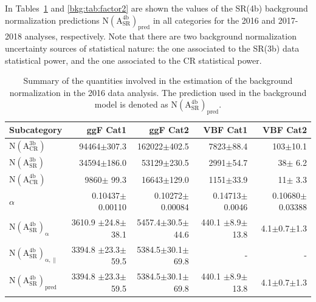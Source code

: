 In Tables~\ref{bkg:tab:factor1} and \ref{bkg:tab:factor2} are shown the values of the SR(4b) background normalization predictions $\mathrm{N(A_{SR}^{4b})_{pred}}$ in all categories for the 2016 and 2017-2018 analyses, respectively. Note that there are two background normalization uncertainty sources of statistical nature: the one associated to the SR(3b) data statistical power, and the one associated to the CR statistical power.

\begin{table}[htb!]
\caption[Summary of the quantities involved in the estimation of the background normalization in the 2016 data analysis.]{\label{bkg:tab:factor1} Summary of the quantities involved in the estimation of the background normalization in the 2016 data analysis. The prediction used in the background model is denoted as $\mathrm{N(A_{SR}^{4b})_{pred}}$.}
\centering
\small
\begin{tabularx}{\textwidth}{l r r r r}
    \hline
    Subcategory                    & ggF Cat1                      & ggF Cat2                    & VBF Cat1                     & VBF Cat2                  \\
    \hline
    $\mathrm{N(A_{CR}^{3b})}$         & 94464$\pm$307.3          & 162022$\pm$402.5        & 7823$\pm$88.4            &    103$\pm$10.1       \\
    $\mathrm{N(A_{SR}^{3b})}$         & 34594$\pm$186.0          &  53129$\pm$230.5        & 2991$\pm$54.7            &     38$\pm$ 6.2       \\
    $\mathrm{N(A_{CR}^{4b})}$         &  9860$\pm$ 99.3          &  16643$\pm$129.0        & 1151$\pm$33.9            &     11$\pm$ 3.3       \\
    $\alpha$                                    & 0.10437$\pm$0.00110      &0.10272$\pm$0.00084      &0.14713$\pm$0.0046        &0.10680$\pm$0.03388    \\
    $\mathrm{N(A_{SR}^{4b})_{\alpha}}$          & 3610.9 $\pm$24.8$\pm$38.1& 5457.4$\pm$30.5$\pm$44.6     & 440.1 $\pm$8.9$\pm$13.8  &    4.1$\pm$0.7$\pm$1.3\\
    $\mathrm{N(A_{SR}^{4b})_{\alpha,\parallel}}$& 3394.8 $\pm$23.3$\pm$59.5& 5384.5$\pm$30.1$\pm$69.8     &          -               &         -             \\
    $\mathrm{N(A_{SR}^{4b})_{pred}}$            & 3394.8 $\pm$23.3$\pm$59.5& 5384.5$\pm$30.1$\pm$69.8     & 440.1 $\pm$8.9$\pm$13.8  &    4.1$\pm$0.7$\pm$1.3\\  
    \hline
\end{tabularx}
\end{table}

